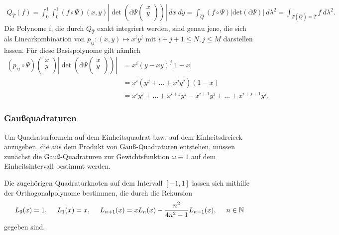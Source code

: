 \begin{align*}
    Q_{\hat{T}}(f) = \int_{0}^{1}\int_{0}^{1}(f\circ\Psi)(x,y)|\det(\mathrm{d}\Psi
    \left(\begin{array}{rr}
    x \\
    y \\
    \end{array}\right)
    )|~dx~dy =\int_{\hat{Q}}(f\circ\Psi)|\mathrm{det}(\mathrm{d}\Psi)|~d\lambda^{2} = \int_{\Psi(\hat{Q}) = \hat{T}} f~d\lambda^{2}.
\end{align*}
Die Polynome f, die durch $Q_{\hat{T}}$ exakt integriert werden, sind genau jene, die sich als Linearkombination von $p_{ij}: (x,y) \mapsto x^i y^j$ mit $i+j+1\leq N, j \leq M$ darstellen lassen. Für diese Basispolynome gilt nämlich
\begin{align*}
    (p_{ij}\circ\Psi)
    \left(\begin{array}{rr}
    x \\
    y \\
    \end{array}\right)
    |\det(\mathrm{d}\Psi
    \left(\begin{array}{rr}
    x \\
    y \\
    \end{array}\right)
    )| &= x^{i}(y-xy)^{j}|1-x| \\
    &= x^{i}(y^{j}+\dots\pm x^{j}y^{j})(1-x) \\
    &= x^{i}y^{j}+\dots\pm x^{i+j}y^{j} - x^{i+1}y^{j}+\dots\pm x^{i+j+1}y^{j}.
\end{align*}
\newline

\subsubsection{Gaußquadraturen}
Um Quadraturformeln auf dem Einheitsquadrat bzw. auf dem Einheitsdreieck anzugeben, die aus dem Produkt von Gauß-Quadraturen entstehen, müssen zunächst die Gauß-Quadraturen zur Gewichtsfunktion $\omega \equiv 1$ auf dem Einheitsintervall bestimmt werden.

Die zugehörigen Quadraturknoten auf dem Intervall $[-1,1]$ lassen sich mithilfe der Orthogonalpolynome bestimmen, die durch die Rekursion
\begin{align*}
    L_{0}(x) = 1,~~~~L_{1}(x)=x,~~~~L_{n+1}(x) = xL_{n}(x)-\frac{n^{2}}{4n^{2}-1}L_{n-1}(x),~~~~n \in \mathbb{N}
\end{align*}
gegeben sind.


